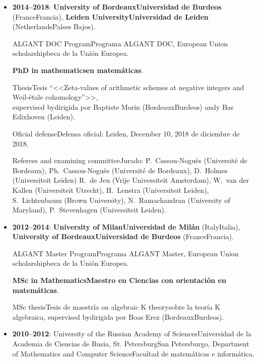 \documentclass{article}
\newcommand{\biling}[2]{\ifdefined\english#1\fi\ifdefined\spanish#2\fi}
\begin{document}
\begin{itemize}
\item \textbf{2014--2018}: \textbf{\biling{University of Bordeaux}{Universidad de Burdeos}} (\biling{France}{Francia}),
  \textbf{\biling{Leiden University}{Universidad de Leiden}} (\biling{Netherlands}{Países Bajos}).

  \biling{ALGANT DOC Program}{Programa ALGANT DOC}, \biling{European Union scholarship}{beca de la Unión Europea}.

  \textbf{PhD \biling{in mathematics}{en matemáticas}}.

  \biling{Thesis}{Tesis} \biling{``}{<<}Zeta-values of arithmetic schemes at negative integers and Weil-étale cohomology\biling{''}{>>},\\
  \biling{supervised by}{dirigida por} Baptiste Morin (\biling{Bordeaux}{Burdeos}) \biling{and}{y} Bas Edixhoven (Leiden).

  \biling{Oficial defense}{Defensa oficial}: Leiden, \biling{December 10, 2018}{10 de diciembre de 2018}.

  \biling{Referees and examining committee}{Jurado}:
  P.~Cassou-Noguès (Université de Bordeaux),
  Ph.~Cassou-Noguès (Université de Bordeaux),
  D.~Holmes (Universiteit Leiden)
  R.~de Jeu (Vrije Universiteit Amsterdam),
  W.~van der Kallen (Universiteit Utrecht),
  H.~Lenstra (Universiteit Leiden),
  S.~Lichtenbaum (Brown University),
  N.~Ramachandran (University of Maryland),
  P.~Stevenhagen (Universiteit Leiden).

\item \textbf{2012--2014}: \textbf{\biling{University of Milan}{Universidad de Milán}} (\biling{Italy}{Italia}),
  \textbf{\biling{University of Bordeaux}{Universidad de Burdeos}} (\biling{France}{Francia}).

  \biling{ALGANT Master Program}{Programa ALGANT Master}, \biling{European Union scholarship}{beca de la Unión Europea}.

  \textbf{\biling{MSc in Mathematics}{Maestro en Ciencias con orientación en matemáticas}}.

  \biling{MSc thesis}{Tesis de maestría}
  \biling{on algebraic K theory}{sobre la teoría K algebraica},
  \biling{supervised by}{dirigida por} Boas Erez (\biling{Bordeaux}{Burdeos}).

\item \textbf{2010--2012}: \biling{University of the Russian Academy of Sciences}{Universidad de la Academia de Ciencias de Rusia},
  \biling{St. Petersburg}{San Petersburgo}, \biling{Department of Mathematics and Computer Science}{Facultad de matemáticas e informática}.


\end{itemize}
\end{document}
